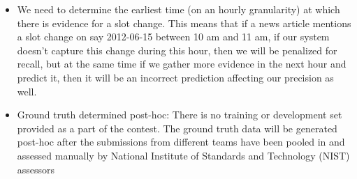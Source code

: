 \begin{itemize}
\item We need to determine the earliest time (on an hourly granularity) at which there is evidence for a slot change. This means that if a news article mentions a slot change on say 2012-06-15 between 10 am and 11 am, if our system doesn’t capture this change during this hour, then we will be penalized for recall, but at the same time if we gather more evidence in the next hour and predict it, then it will be an incorrect prediction affecting our precision as well.
\item Ground truth determined post-hoc: There is no training or development set provided as a part of the contest. The ground truth data will be generated post-hoc after the submissions from different teams have been pooled in and assessed manually by National Institute of Standards and Technology (NIST) assessors
\end{itemize}
